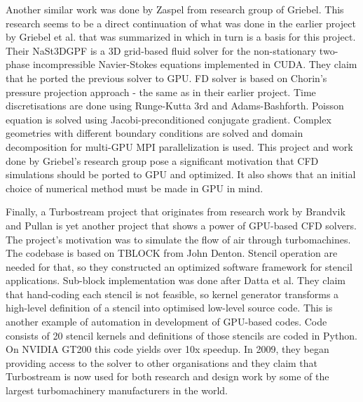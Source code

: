 
Another similar work was done by Zaspel from research group of Griebel. This research seems to be a direct continuation of what was done in the earlier project by Griebel et al. that was summarized in \cite{griebel1998numerical} which in turn is a basis for this project. Their NaSt3DGPF is a 3D grid-based fluid solver for the non-stationary two-phase incompressible Navier-Stokes equations implemented in CUDA. They claim that he ported the previous solver to GPU. FD solver is based on Chorin's pressure projection approach - the same as in their earlier project. Time discretisations are done using Runge-Kutta 3rd and Adams-Bashforth. Poisson equation is solved using Jacobi-preconditioned conjugate gradient. Complex geometries with different boundary conditions are solved and domain decomposition for multi-GPU MPI parallelization is used. This project and work done by Griebel's research group pose a significant motivation that CFD simulations should be ported to GPU and optimized. It also shows that an initial choice of numerical method must be made in GPU in mind.


Finally, a Turbostream project that originates from research work by Brandvik and Pullan is yet another project that shows a power of GPU-based CFD solvers. The project's motivation was to simulate the flow of air through turbomachines. The codebase is based on TBLOCK from John Denton. Stencil operation are needed for that, so they constructed an optimized software framework for stencil applications. Sub-block implementation was done after Datta et al. They claim that hand-coding each stencil is not feasible, so kernel generator transforms a high-level definition of a stencil into optimised low-level source code. This is another example of automation in development of GPU-based codes. Code consists of 20 stencil kernels and definitions of those stencils are coded in Python. On NVIDIA GT200 this code yields over 10x speedup. In 2009, they began providing access to the solver to other organisations and they claim that Turbostream is now used for both research and design work by some of the largest turbomachinery manufacturers in the world.

